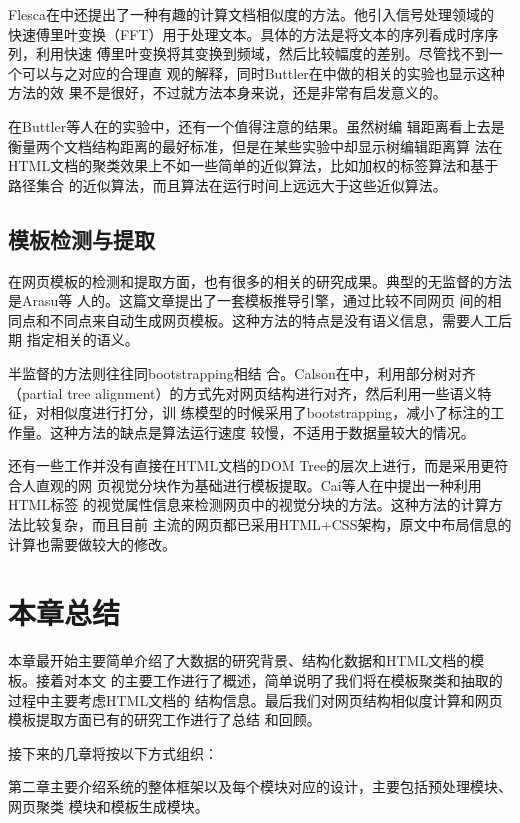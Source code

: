 Flesca在\cite{fft}中还提出了一种有趣的计算文档相似度的方法。他引入信号处理领域的
快速傅里叶变换（FFT）用于处理文本。具体的方法是将文本的序列看成时序序列，利用快速
傅里叶变换将其变换到频域，然后比较幅度的差别。尽管找不到一个可以与之对应的合理直
观的解释，同时Buttler在\cite{buttler2004short}中做的相关的实验也显示这种方法的效
果不是很好，不过就方法本身来说，还是非常有启发意义的。

在Buttler等人在\cite{buttler2004short}的实验中，还有一个值得注意的结果。虽然树编
辑距离看上去是衡量两个文档结构距离的最好标准，但是在某些实验中却显示树编辑距离算
法在HTML文档的聚类效果上不如一些简单的近似算法，比如加权的标签算法和基于路径集合
的近似算法，而且算法在运行时间上远远大于这些近似算法。

\subsection{模板检测与提取}
\label{sec:relatedwork:template}
在网页模板的检测和提取方面，也有很多的相关的研究成果。典型的无监督的方法是Arasu等
人的\cite{arasu2003extracting}。这篇文章提出了一套模板推导引擎，通过比较不同网页
间的相同点和不同点来自动生成网页模板。这种方法的特点是没有语义信息，需要人工后期
指定相关的语义。

半监督的方法则往往同bootstrapping相结
合。Calson在\cite{carlson2008bootstrapping}中，利用部分树对齐（partial tree
alignment）的方式先对网页结构进行对齐，然后利用一些语义特征，对相似度进行打分，训
练模型的时候采用了bootstrapping，减小了标注的工作量。这种方法的缺点是算法运行速度
较慢，不适用于数据量较大的情况。

还有一些工作并没有直接在HTML文档的DOM Tree的层次上进行，而是采用更符合人直观的网
页视觉分块作为基础进行模板提取。Cai等人在\cite{cai2003vips}中提出一种利用HTML标签
的视觉属性信息来检测网页中的视觉分块的方法。这种方法的计算方法比较复杂，而且目前
主流的网页都已采用HTML+CSS架构，原文中布局信息的计算也需要做较大的修改。
\section{本章总结}
\label{sec:summaryintro}
本章最开始主要简单介绍了大数据的研究背景、结构化数据和HTML文档的模板。接着对本文
的主要工作进行了概述，简单说明了我们将在模板聚类和抽取的过程中主要考虑HTML文档的
结构信息。最后我们对网页结构相似度计算和网页模板提取方面已有的研究工作进行了总结
和回顾。

接下来的几章将按以下方式组织：

第二章主要介绍系统的整体框架以及每个模块对应的设计，主要包括预处理模块、网页聚类
模块和模板生成模块。

